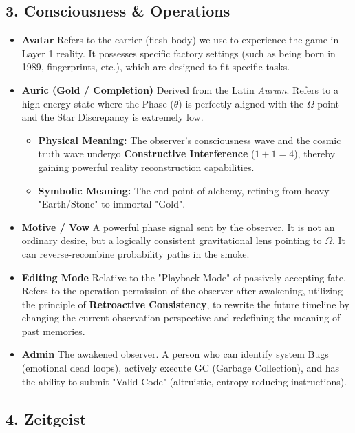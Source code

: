 \subsection*{3. Consciousness \& Operations}

\begin{itemize}
\item \textbf{Avatar}
Refers to the carrier (flesh body) we use to experience the game in Layer 1 reality. It possesses specific factory settings (such as being born in 1989, fingerprints, etc.), which are designed to fit specific tasks.

\item \textbf{Auric (Gold / Completion)}
Derived from the Latin \textit{Aurum}. Refers to a high-energy state where the Phase ($\theta$) is perfectly aligned with the $\Omega$ point and the Star Discrepancy is extremely low.
\begin{itemize}
\item \textbf{Physical Meaning:} The observer's consciousness wave and the cosmic truth wave undergo \textbf{Constructive Interference} ($1 + 1 = 4$), thereby gaining powerful reality reconstruction capabilities.
\item \textbf{Symbolic Meaning:} The end point of alchemy, refining from heavy "Earth/Stone" to immortal "Gold".
\end{itemize}

\item \textbf{Motive / Vow}
A powerful phase signal sent by the observer. It is not an ordinary desire, but a logically consistent gravitational lens pointing to $\Omega$. It can reverse-recombine probability paths in the smoke.

\item \textbf{Editing Mode}
Relative to the "Playback Mode" of passively accepting fate. Refers to the operation permission of the observer after awakening, utilizing the principle of \textbf{Retroactive Consistency}, to rewrite the future timeline by changing the current observation perspective and redefining the meaning of past memories.

\item \textbf{Admin}
The awakened observer. A person who can identify system Bugs (emotional dead loops), actively execute GC (Garbage Collection), and has the ability to submit "Valid Code" (altruistic, entropy-reducing instructions).
\end{itemize}

\subsection*{4. Zeitgeist}

